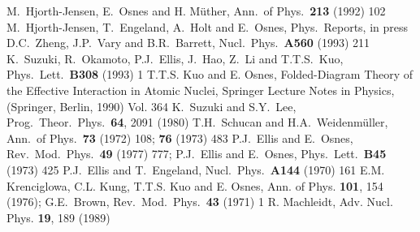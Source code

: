 \begin{thebibliography}{100}

  M.\ Hjorth-Jensen, E.\ Osnes and H. M\"uther,
Ann.\ of Phys.\ {\bf 213} (1992) 102
  M.\ Hjorth-Jensen, T.\ Engeland, A.\ Holt and E.\ Osnes,
Phys.\  Reports, in press
 D.C.\ Zheng, J.P.\ Vary and B.R.\ Barrett,
Nucl.\ Phys.\ {\bf A560} (1993) 211
 K.\ Suzuki, R.\ Okamoto, P.J.\ Ellis,
J.\ Hao, Z.\ Li and T.T.S.\ Kuo,  Phys.\ Lett.\ {\bf B308} (1993) 1
  T.T.S. Kuo and E. Osnes, Folded-Diagram Theory of the
Effective Interaction in Atomic Nuclei, Springer Lecture Notes in Physics,
(Springer, Berlin, 1990) Vol. 364
 K.\ Suzuki and S.Y.\ Lee, Prog.\ Theor.\ Phys.\ {\bf 64},
2091 (1980)
 T.H.\ Schucan and H.A.\ Weidenm\"{u}ller, Ann.\ of Phys.\
{\bf 73} (1972) 108; {\bf 76} (1973) 483
 P.J.\ Ellis and E.\ Osnes, Rev.\ Mod.\ Phys.\
{\bf 49} (1977) 777; 
P.J.\ Ellis and E.\ Osnes, 
Phys.\ Lett.\ {\bf B45} (1973) 425
 P.J.\ Ellis and T.\ Engeland, Nucl.\ Phys.\ {\bf A144}
(1970) 161
\bibitem{kkko76}  E.M. Krenciglowa, C.L. Kung, 
T.T.S. Kuo and E. Osnes, Ann.
of Phys. {\bf 101}, 154 (1976); 
G.E.\ Brown, Rev.\ Mod.\ Phys.\ {\bf 43}
(1971) 1
  R. Machleidt, Adv. Nucl. Phys. {\bf 19}, 189 (1989)

\end{thebibliography}




